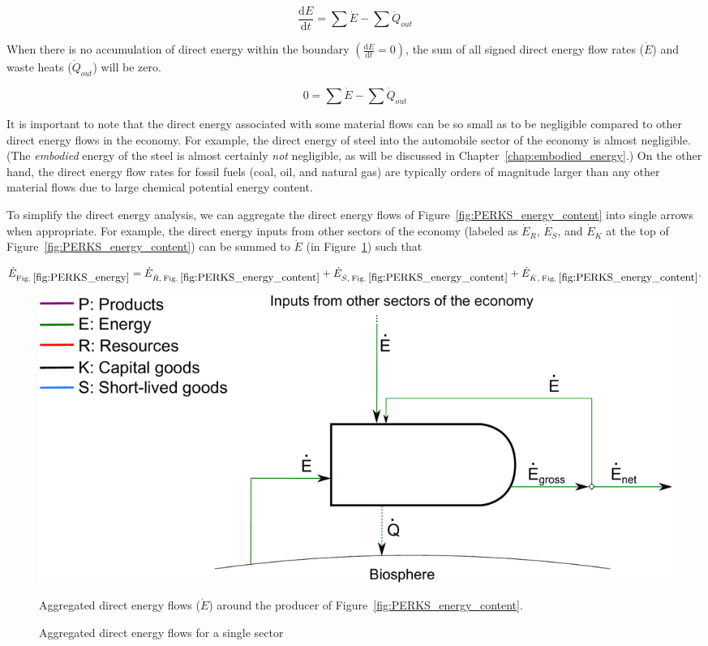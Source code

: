 \begin{equation} \label{eq:First_Law_with_accumulation}
	\frac{\mathrm{d}E}{\mathrm{d}t} = \sum \dot{E} - \sum \dot{Q}_{out}
\end{equation}

When there is no accumulation of direct energy within the boundary
$\left( \frac{\mathrm{d}E}{\mathrm{d}t} = 0 \right)$, the sum of all 
signed direct energy flow rates ($\dot{E}$) 
and waste heats ($\dot{Q}_{out}$) will be zero.

\begin{equation} \label{eq:First_Law_no_accumulation}
	0 = \sum \dot{E} - \sum \dot{Q}_{out}
\end{equation}

It is important to note that the direct energy associated with some material flows can
be so small as to be negligible compared to other direct energy flows in the economy.
For example, the direct energy of steel into the automobile sector of the economy 
is almost negligible. (The \emph{embodied} energy of the steel is almost certainly
\emph{not} negligible, as will be discussed in Chapter~\ref{chap:embodied_energy}.)
On the other hand, the direct energy flow rates for 
fossil fuels
(coal, oil, and natural gas)
are typically orders of magnitude larger than any other 
material flows due to large chemical potential energy content.

To simplify the direct energy analysis, 
we can aggregate the direct energy flows of Figure~\ref{fig:PERKS_energy_content}
into single arrows when appropriate. 
For example, the direct energy inputs from other sectors of the economy
(labeled as $\dot{E}_{\dot{R}}$, $\dot{E}_{\dot{S}}$, and $\dot{E}_{\dot{K}}$ 
at the top of Figure~\ref{fig:PERKS_energy_content}) can be summed to $\dot{E}$ 
(in Figure~\ref{fig:PERKS_energy}) such that

\begin{equation} \label{eq:direct_energy_aggregation}
	\dot{E}_{\mathrm{Fig.\:\ref{fig:PERKS_energy}}} 
	= \dot{E}_{\dot{R},\:\mathrm{Fig.\:\ref{fig:PERKS_energy_content}}} 
	+ \dot{E}_{\dot{S},\:\mathrm{Fig.\:\ref{fig:PERKS_energy_content}}} 
	+ \dot{E}_{\dot{K},\:\mathrm{Fig.\:\ref{fig:PERKS_energy_content}}}.
\end{equation}

\begin{figure}[!ht]
\centering
\includegraphics[width=0.8\linewidth]{Part_2/Chapter_Energy/images/PERKS_basic_unit_energy.pdf}
\caption{Aggregated direct energy flows for a single sector}{Aggregated direct energy flows ($\dot{E}$) around 
the producer of Figure~\ref{fig:PERKS_energy_content}.}
\label{fig:PERKS_energy}
\end{figure}


